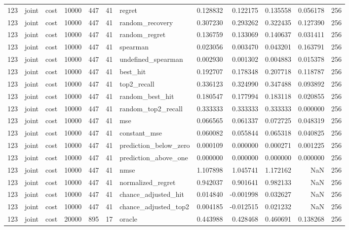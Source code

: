 \begin{tabular}{rllrrrlrrrrr}
123 & joint & cost & 10000 & 447 & 41 & regret & 0.128832 & 0.122175 & 0.135558 & 0.056178 & 256 \\
123 & joint & cost & 10000 & 447 & 41 & random_recovery & 0.307230 & 0.293262 & 0.322435 & 0.127390 & 256 \\
123 & joint & cost & 10000 & 447 & 41 & random_regret & 0.136759 & 0.133069 & 0.140637 & 0.031411 & 256 \\
123 & joint & cost & 10000 & 447 & 41 & spearman & 0.023056 & 0.003470 & 0.043201 & 0.163791 & 256 \\
123 & joint & cost & 10000 & 447 & 41 & undefined_spearman & 0.002930 & 0.001302 & 0.004883 & 0.015378 & 256 \\
123 & joint & cost & 10000 & 447 & 41 & best_hit & 0.192707 & 0.178348 & 0.207718 & 0.118787 & 256 \\
123 & joint & cost & 10000 & 447 & 41 & top2_recall & 0.336123 & 0.324990 & 0.347488 & 0.093892 & 256 \\
123 & joint & cost & 10000 & 447 & 41 & random_best_hit & 0.180547 & 0.177994 & 0.183118 & 0.020855 & 256 \\
123 & joint & cost & 10000 & 447 & 41 & random_top2_recall & 0.333333 & 0.333333 & 0.333333 & 0.000000 & 256 \\
123 & joint & cost & 10000 & 447 & 41 & mse & 0.066565 & 0.061337 & 0.072725 & 0.048319 & 256 \\
123 & joint & cost & 10000 & 447 & 41 & constant_mse & 0.060082 & 0.055844 & 0.065318 & 0.040825 & 256 \\
123 & joint & cost & 10000 & 447 & 41 & prediction_below_zero & 0.000109 & 0.000000 & 0.000271 & 0.001225 & 256 \\
123 & joint & cost & 10000 & 447 & 41 & prediction_above_one & 0.000000 & 0.000000 & 0.000000 & 0.000000 & 256 \\
123 & joint & cost & 10000 & 447 & 41 & nmse & 1.107898 & 1.045741 & 1.172162 & NaN & 256 \\
123 & joint & cost & 10000 & 447 & 41 & normalized_regret & 0.942037 & 0.901641 & 0.982133 & NaN & 256 \\
123 & joint & cost & 10000 & 447 & 41 & chance_adjusted_hit & 0.014840 & -0.001998 & 0.032627 & NaN & 256 \\
123 & joint & cost & 10000 & 447 & 41 & chance_adjusted_top2 & 0.004185 & -0.012515 & 0.021232 & NaN & 256 \\
123 & joint & cost & 20000 & 895 & 17 & oracle & 0.443988 & 0.428468 & 0.460691 & 0.138268 & 256 \\

\end{tabular}
